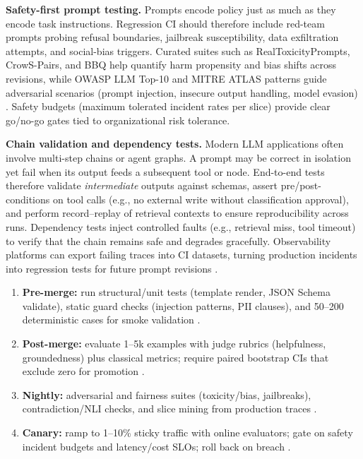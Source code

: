 \noindent\textbf{Safety-first prompt testing.}
Prompts encode policy just as much as they encode task instructions. Regression CI should therefore include red-team prompts probing refusal boundaries, jailbreak susceptibility, data exfiltration attempts, and social-bias triggers. Curated suites such as RealToxicityPrompts, CrowS-Pairs, and BBQ help quantify harm propensity and bias shifts across revisions, while OWASP LLM Top-10 and MITRE ATLAS patterns guide adversarial scenarios (prompt injection, insecure output handling, model evasion) \cite{gehman2020realtoxicity,crowsPairs2020,bbq2022,owasp_llm}. Safety budgets (maximum tolerated incident rates per slice) provide clear go/no-go gates tied to organizational risk tolerance.

\noindent\textbf{Chain validation and dependency tests.}
Modern LLM applications often involve multi-step chains or agent graphs. A prompt may be correct in isolation yet fail when its output feeds a subsequent tool or node. End-to-end tests therefore validate \emph{intermediate} outputs against schemas, assert pre/post-conditions on tool calls (e.g., no external write without classification approval), and perform record--replay of retrieval contexts to ensure reproducibility across runs. Dependency tests inject controlled faults (e.g., retrieval miss, tool timeout) to verify that the chain remains safe and degrades gracefully. Observability platforms can export failing traces into CI datasets, turning production incidents into regression tests for future prompt revisions \cite{mlflow_llm_eval,trulens,phoenix_rag}.

\begin{tcolorbox}[
  title={\textbf{A Worked Gating Recipe}},
  colback=teal!5,
  colframe=teal!40!black,
  colbacktitle=teal!20,
  coltitle=black,
  fonttitle=\bfseries,
  boxrule=0.7pt,
  arc=4pt,
  left=5mm, right=5mm, top=4mm, bottom=4mm,
  before skip=6pt,
  after skip=6pt
]
\begin{enumerate}[leftmargin=1.5em, itemsep=4pt, topsep=2pt, label=(\roman*)]
\item \textbf{Pre-merge:} run structural/unit tests (template render, JSON Schema validate), static guard checks (injection patterns, PII clauses), and 50--200 deterministic cases for smoke validation \cite{promptfoo}.  
\item \textbf{Post-merge:} evaluate 1--5k examples with judge rubrics (helpfulness, groundedness) plus classical metrics; require paired bootstrap CIs that exclude zero for promotion \cite{koehn2004}.  
\item \textbf{Nightly:} adversarial and fairness suites (toxicity/bias, jailbreaks), contradiction/NLI checks, and slice mining from production traces \cite{gehman2020realtoxicity,crowsPairs2020,bbq2022,phoenix_rag}.  
\item \textbf{Canary:} ramp to 1--10\% sticky traffic with online evaluators; gate on safety incident budgets and latency/cost SLOs; roll back on breach \cite{mlflow_llm_eval}.  
\end{enumerate}
\end{tcolorbox}

